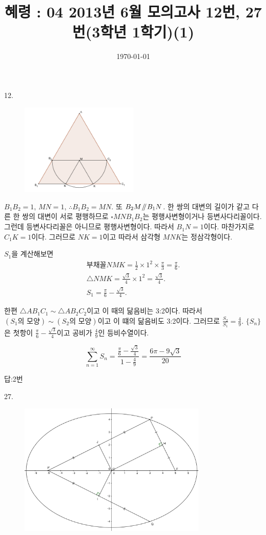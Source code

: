 \documentclass{article}
\title{혜령 : 04 2013년 6월 모의고사 12번, 27번(3학년 1학기)(1)}
\date{\today}
\author{}
\newcommand{\parall}{\mathbin{\!/\mkern-5mu/\!}}
\begin{document}
12.

\begin{figure}[h]
\centering
\includegraphics[width=0.5\textwidth]{12}
\end{figure}

\(B_1B_2=1\), \(MN=1\), \(\therefore B_1B_2=MN\).
또 \(B_2M\parall B_1N\).
한 쌍의 대변의 길이가 같고 다른 한 쌍의 대변이 서로 평행하므로 \(\square MNB_1B_2\)는 평행사변형이거나 등변사다리꼴이다.
그런데 등변사다리꼴은 아니므로 평행사변형이다.
따라서 \(B_1N=1\)이다.
마찬가지로 \(C_1K=1\)이다.
그러므로 \(NK=1\)이고 따라서 삼각형 \(MNK\)는 정삼각형이다.

\(S_1\)을 계산해보면
\begin{gather*}
부채꼴 NMK=\frac12\times1^2\times\frac\pi3=\frac\pi6.\\
\triangle NMK=\frac{\sqrt3}4\times1^2=\frac{\sqrt3}4.\\
S_1=\frac\pi6-\frac{\sqrt3}4.
\end{gather*}

한편 \(\triangle AB_1C_1\sim\triangle AB_2C_2\)이고 이 때의 닮음비는 3:2이다.
따라서 \((S_1\text{의 모양})\sim(S_2\text{의 모양})\)이고 이 떄의 닮음비도 3:2이다.
그러므로 \(\frac{S_2}{S_1}=\frac49\).
\(\{S_n\}\)은 첫항이 \(\frac\pi6-\frac{\sqrt3}4\)이고 공비가 \(\frac49\)인 등비수열이다.

\[\sum_{n=1}^\infty S_n=\frac{\frac\pi6-\frac{\sqrt3}4}{1-\frac49}=\frac{6\pi-9\sqrt3}{20}\]

\begin{mdframed}[leftmargin=0.91\textwidth,innerleftmargin=5pt]
답:2번
\end{mdframed}
\newpage

27.

\begin{figure}[h]
\centering
\includegraphics[width=0.8\textwidth]{27}
\end{figure}
\end{document}
